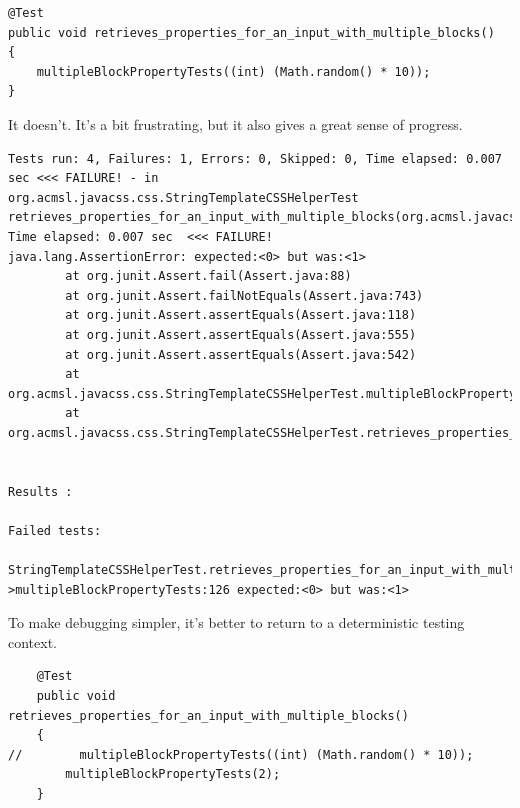 \documentclass[11pt]{article}
\begin{document}
\begin{verbatim}
@Test
public void retrieves_properties_for_an_input_with_multiple_blocks()
{
    multipleBlockPropertyTests((int) (Math.random() * 10));
}
\end{verbatim}

It doesn't. It's a bit frustrating, but it also gives a great sense of progress.

\begin{verbatim}
Tests run: 4, Failures: 1, Errors: 0, Skipped: 0, Time elapsed: 0.007 sec <<< FAILURE! - in org.acmsl.javacss.css.StringTemplateCSSHelperTest
retrieves_properties_for_an_input_with_multiple_blocks(org.acmsl.javacss.css.StringTemplateCSSHelperTest)  Time elapsed: 0.007 sec  <<< FAILURE!
java.lang.AssertionError: expected:<0> but was:<1>
        at org.junit.Assert.fail(Assert.java:88)
        at org.junit.Assert.failNotEquals(Assert.java:743)
        at org.junit.Assert.assertEquals(Assert.java:118)
        at org.junit.Assert.assertEquals(Assert.java:555)
        at org.junit.Assert.assertEquals(Assert.java:542)
        at org.acmsl.javacss.css.StringTemplateCSSHelperTest.multipleBlockPropertyTests(StringTemplateCSSHelperTest.java:126)
        at org.acmsl.javacss.css.StringTemplateCSSHelperTest.retrieves_properties_for_an_input_with_multiple_blocks(StringTemplateCSSHelperTest.java:150)


Results :

Failed tests: 
  StringTemplateCSSHelperTest.retrieves_properties_for_an_input_with_multiple_blocks:150->multipleBlockPropertyTests:126 expected:<0> but was:<1>
\end{verbatim}

To make debugging simpler, it's better to return to a deterministic testing context.


\begin{verbatim}
    @Test
    public void retrieves_properties_for_an_input_with_multiple_blocks()
    {
//        multipleBlockPropertyTests((int) (Math.random() * 10));
        multipleBlockPropertyTests(2);
    }
\end{verbatim}
\end{document}

